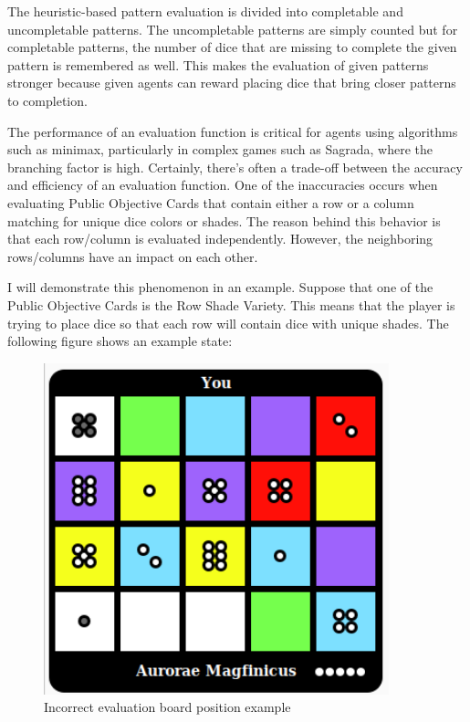 The heuristic-based pattern evaluation is divided into completable and uncompletable patterns. The uncompletable
patterns are simply counted but for completable patterns, the number of dice that are missing to complete
the given pattern is remembered as well. This makes the evaluation of given patterns stronger because given agents can reward
placing dice that bring closer patterns to completion. 

The performance of an evaluation function is critical for agents using algorithms such as minimax, particularly in complex games 
such as Sagrada, where the branching factor is high. Certainly, there's often a trade-off between the accuracy and efficiency of an evaluation function. 
One of the inaccuracies occurs when evaluating Public Objective Cards that contain either a row or a column matching for unique dice colors or shades.
The reason behind this behavior is that each row/column is evaluated independently. However, the neighboring rows/columns have an impact on each other.

I will demonstrate this phenomenon in an example. Suppose that one of the Public Objective Cards is the Row Shade Variety. This means that the player is trying
to place dice so that each row will contain dice with unique shades. The following figure shows an example state:


\begin{figure}[H]
    \caption{ Incorrect evaluation board position example}
    \centerline{\mbox{\includegraphics[width=100mm]{img/IncorrectBoardEvaluationExample.png}}}
    \label{fig:example}
\end{figure}



